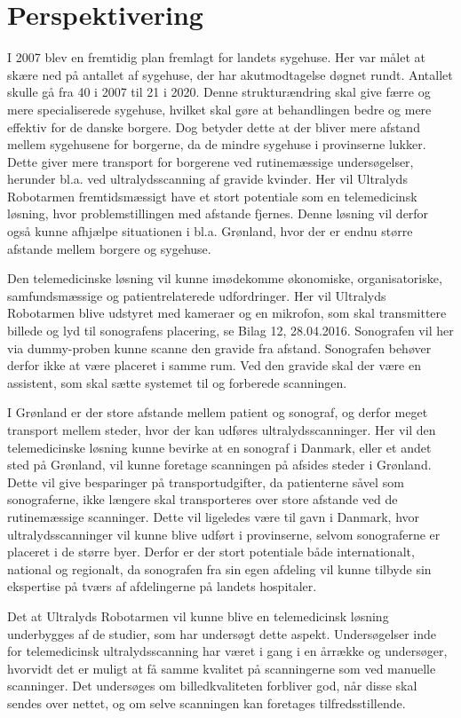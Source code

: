 \chapter{Perspektivering}

I 2007 blev en fremtidig plan fremlagt for landets sygehuse. Her var målet at skære ned på antallet af sygehuse, der har akutmodtagelse døgnet rundt. Antallet skulle gå fra 40 i 2007 til 21 i 2020. Denne strukturændring skal give færre og mere specialiserede sygehuse, hvilket skal gøre at behandlingen bedre og mere effektiv for de danske borgere. Dog betyder dette at der bliver mere afstand mellem sygehusene for borgerne, da de mindre sygehuse i provinserne lukker. Dette giver mere transport for borgerene ved rutinemæssige undersøgelser, herunder bl.a. ved ultralydsscanning af gravide kvinder. Her vil Ultralyds Robotarmen fremtidsmæssigt have et stort potentiale som en telemedicinsk løsning, hvor problemstillingen med afstande fjernes. Denne løsning vil derfor også kunne afhjælpe situationen i bl.a. Grønland, hvor der er endnu større afstande mellem borgere og sygehuse. \cite{greenland}

Den telemedicinske løsning vil kunne imødekomme økonomiske, organisatoriske, samfundsmæssige og patientrelaterede udfordringer. Her vil Ultralyds Robotarmen blive udstyret med kameraer og en mikrofon, som skal transmittere billede og lyd til sonografens placering, se Bilag 12, 28.04.2016. Sonografen vil her via dummy-proben kunne scanne den gravide fra afstand. Sonografen behøver derfor ikke at være placeret i samme rum. Ved den gravide skal der være en assistent, som skal sætte systemet til og forberede scanningen.

I Grønland er der store afstande mellem patient og sonograf, og derfor meget transport mellem steder, hvor der kan udføres ultralydsscanninger. Her vil den telemedicinske løsning kunne bevirke at en sonograf i Danmark, eller et andet sted på Grønland, vil kunne foretage scanningen på afsides steder i Grønland. Dette vil give besparinger på transportudgifter, da patienterne såvel som sonograferne, ikke længere skal transporteres over store afstande ved de rutinemæssige scanninger. 
Dette vil ligeledes være til gavn i Danmark, hvor ultralydsscanninger vil kunne blive udført i provinserne, selvom sonograferne er placeret i de større byer. Derfor er der stort potentiale både internationalt, national og regionalt, da sonografen fra sin egen afdeling vil kunne tilbyde sin ekspertise på tværs af afdelingerne på landets hospitaler. 

Det at Ultralyds Robotarmen vil kunne blive en telemedicinsk løsning underbygges af de studier, som har undersøgt dette aspekt. Undersøgelser inde for telemedicinsk ultralydsscanning har været i gang i en årrække og undersøger, hvorvidt det er muligt at få samme kvalitet på scanningerne som ved manuelle scanninger. Det undersøges om billedkvaliteten forbliver god, når disse skal sendes over nettet, og om selve scanningen kan foretages tilfredsstillende\citep{5}\citep{8}\citep{18}. 





